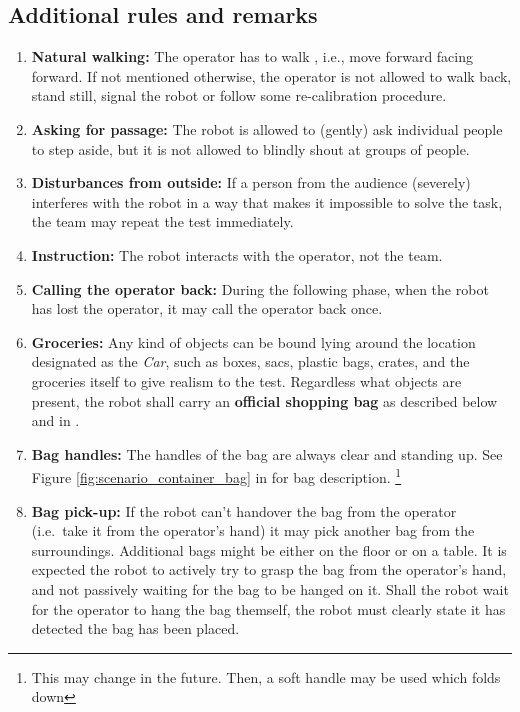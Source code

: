 \subsection{Additional rules and remarks}
\begin{enumerate}
  \item \textbf{Natural walking:} The operator has to walk , i.e., move forward facing forward. If not mentioned otherwise, the operator is not allowed to walk back, stand still, signal the robot or follow some re-calibration procedure.

  \item \textbf{Asking for passage:} The robot is allowed to (gently) ask individual people to step aside, but it is not allowed to blindly shout at groups of people.

  \item \textbf{Disturbances from outside:} If a person from the audience (severely) interferes with the robot in a way that makes it impossible to solve the task, the team may repeat the test immediately.

  \item \textbf{Instruction:} The robot interacts with the operator, not the team.

  \item \textbf{Calling the operator back:} During the following phase, when the robot has lost the operator, it may call the operator back once.

  \item \textbf{Groceries:} Any kind of objects can be bound lying around the location designated as the \textit{Car}, such as boxes, sacs, plastic bags, crates, and the groceries itself to give realism to the test. Regardless what objects are present, the robot shall carry an \textbf{official shopping bag} as described below and in .

  \item \textbf{Bag handles:} The handles of the bag are always clear and standing up. See Figure \ref{fig:scenario_container_bag} in  for bag description. \footnote{This may change in the future. Then, a soft handle may be used which folds down}
  
  \item \textbf{Bag pick-up:} If the robot can't handover the bag from the operator (i.e.~take it from the operator's hand) it may pick another bag from the surroundings. Additional bags might be either on the floor or on a table. It is expected the robot to actively try to grasp the bag from the operator's hand, and not passively waiting for the bag to be hanged on it. Shall the robot wait for the operator to hang the bag themself, the robot must clearly state it has detected the bag has been placed.


\end{enumerate}
